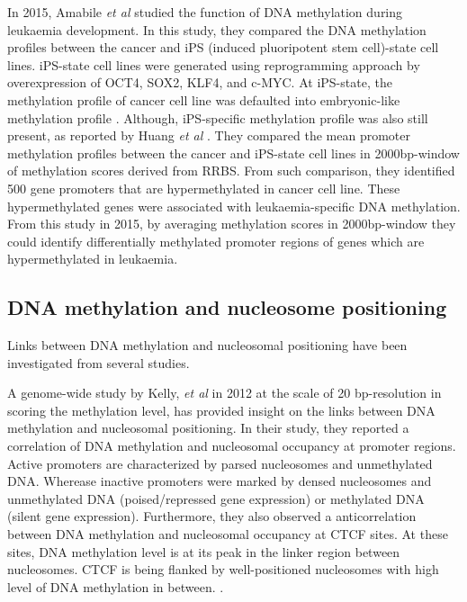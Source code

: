 \documentclass[review,12pt]{elsarticle}
\begin{document}
In 2015, Amabile \textit{et al} studied the function of DNA methylation during leukaemia development.
In this study, they compared the DNA methylation profiles between the cancer and iPS (induced pluoripotent stem cell)-state cell lines.
iPS-state cell lines were generated using reprogramming approach by overexpression of OCT4, SOX2, KLF4, and c-MYC.
At iPS-state, the methylation profile of cancer cell line was defaulted into embryonic-like methylation profile \cite{mikkelsen2008dissecting}.
Although, iPS-specific methylation profile was also still present, as reported by Huang \textit{et al} \cite{huang2014panel}.
They compared the mean promoter methylation profiles between the cancer and iPS-state cell lines in 2000bp-window of methylation scores derived from RRBS.
From such comparison, they identified 500 gene promoters that are hypermethylated in cancer cell line.
These hypermethylated genes were associated with leukaemia-specific DNA methylation.
From this study in 2015, by averaging methylation scores in 2000bp-window they could identify differentially methylated promoter regions of genes which are hypermethylated in leukaemia.


\subsection{DNA methylation and nucleosome positioning}

Links between DNA methylation and nucleosomal positioning have been investigated from several studies.

A genome-wide study by Kelly, \textit{et al} in 2012 at the scale of 20 bp-resolution in scoring the methylation level, has provided insight on the links between DNA methylation and nucleosomal positioning.
In their study, they reported a correlation of DNA methylation and nucleosomal occupancy at promoter regions. 
Active promoters are characterized by parsed nucleosomes and unmethylated DNA.
Wherease inactive promoters were marked by densed nucleosomes and unmethylated DNA (poised/repressed gene expression) or methylated DNA (silent gene expression).
Furthermore, they also observed a anticorrelation between DNA methylation and nucleosomal occupancy at CTCF sites.
At these sites, DNA methylation level is at its peak in the linker region between nucleosomes. 
CTCF is being flanked by well-positioned nucleosomes with high level of DNA methylation in between. \cite{kelly2012genome}.
\end{document}
